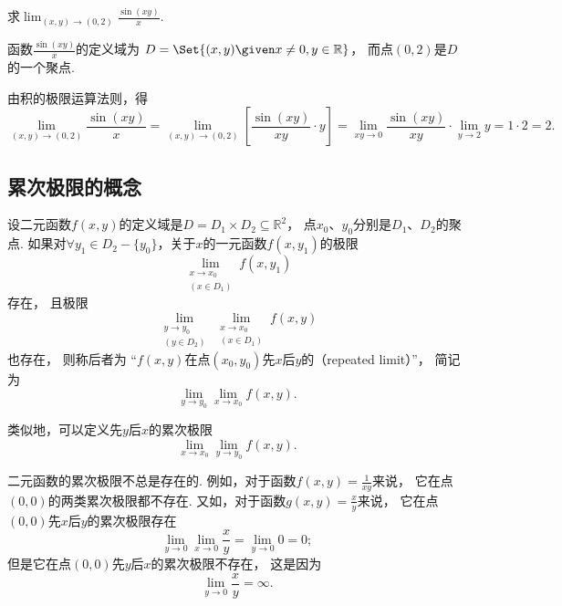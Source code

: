 \begin{example}
求\(\lim_{(x,y)\to(0,2)} \frac{\sin(xy)}{x}\).
\begin{solution}
函数\(\frac{\sin(xy)}{x}\)的定义域为
\(D = \Set{ (x,y) \given x\neq0, y\in\mathbb{R} }\)，
而点\((0,2)\)是\(D\)的一个聚点.

由积的极限运算法则，得\[
	\lim_{(x,y)\to(0,2)} \frac{\sin(xy)}{x}
	= \lim_{(x,y)\to(0,2)} \left[ \frac{\sin(xy)}{xy} \cdot y \right]
	= \lim_{xy\to0} \frac{\sin(xy)}{xy} \cdot \lim_{y\to2} y
	= 1 \cdot 2 = 2.
\]
\end{solution}
\end{example}

\subsection{累次极限的概念}
\begin{definition}
设二元函数\(f(x,y)\)的定义域是\(D = D_1 \times D_2 \subseteq \mathbb{R}^2\)，
点\(x_0\)、\(y_0\)分别是\(D_1\)、\(D_2\)的聚点.
如果对\(\forall y_1 \in D_2 - \{y_0\}\)，关于\(x\)的一元函数\(f(x,y_1)\)的极限\[
	\lim_{\substack{x \to x_0 \\ (x \in D_1)}} f(x,y_1)
\]存在，
且极限\[
	\lim_{\substack{y \to y_0 \\ (y \in D_2)}}
	\lim_{\substack{x \to x_0 \\ (x \in D_1)}} f(x,y)
\]也存在，
则称后者为
“\(f(x,y)\)在点\((x_0,y_0)\)先\(x\)后\(y\)的（repeated limit）”，
简记为\[
	\lim_{y \to y_0} \lim_{x \to x_0} f(x,y).
\]

类似地，可以定义先\(y\)后\(x\)的累次极限\[
	\lim_{x \to x_0} \lim_{y \to y_0} f(x,y).
\]
\end{definition}

二元函数的累次极限不总是存在的.
例如，对于函数\(f(x,y)=\frac1{xy}\)来说，
它在点\((0,0)\)的两类累次极限都不存在.
又如，对于函数\(g(x,y)=\frac{x}{y}\)来说，
它在点\((0,0)\)先\(x\)后\(y\)的累次极限存在\[
	\lim_{y\to0}\lim_{x\to0}\frac{x}{y}
	=\lim_{y\to0}0
	=0;
\]
但是它在点\((0,0)\)先\(y\)后\(x\)的累次极限不存在，
这是因为\[
	\lim_{y\to0}\frac{x}{y}=\infty.
\]

